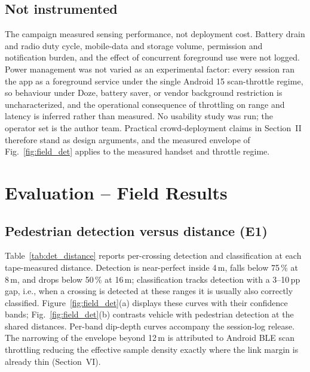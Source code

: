 \documentclass[journal,10pt]{IEEEtran}
\begin{document}
\subsection{Not instrumented}
The campaign measured sensing performance, not deployment cost. Battery drain and
radio duty cycle, mobile-data and storage volume, permission and notification
burden, and the effect of concurrent foreground use were not logged. Power
management was not varied as an experimental factor: every session ran the app as
a foreground service under the single Android 15 scan-throttle regime, so
behaviour under Doze, battery saver, or vendor background restriction is
uncharacterized, and the operational consequence of throttling on range and
latency is inferred rather than measured. No usability study was run; the
operator set is the author team. Practical crowd-deployment claims in
Section~II therefore stand as design arguments, and the measured envelope of
Fig.~\ref{fig:field_det} applies to the measured handset and throttle regime.

\section{Evaluation -- Field Results}
\label{sec:results}

\subsection{Pedestrian detection versus distance (E1)}
Table~\ref{tab:det_distance} reports per-crossing detection and classification at
each tape-measured distance. Detection is near-perfect inside 4\,m, falls
below 75\,\% at 8\,m, and drops below 50\,\% at 16\,m; classification tracks
detection with a 3--10\,pp gap, i.e., when a crossing is detected at these
ranges it is usually also correctly classified. Figure~\ref{fig:field_det}(a) displays these curves with their
confidence bands; Fig.~\ref{fig:field_det}(b) contrasts vehicle with
pedestrian detection at the shared distances. Per-band dip-depth curves
accompany the session-log release.
The narrowing of the envelope beyond 12\,m is attributed to Android BLE scan
throttling reducing the effective sample density exactly where the link
margin is already thin (Section~VI).
\end{document}
